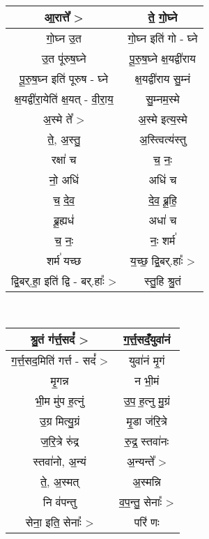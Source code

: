 {\centering
{\small {}} \\
\begin{longtable}{|c|c|}
\hline
आ॒रात्ते᳚ >                      & ते॒ गो॒घ्ने\\
\hline
गो॒घ्न उ॒त                      & गो॒घ्न इति॑ गो - घ्ने\\
\hline
उ॒त पू॑रुष॒घ्ने                     & पू॒रु॒ष॒घ्ने क्ष॒यद्वी॑राय\\
\hline
पू॒रु॒ष॒घ्न इति॑ पूरुष - घ्ने           & क्ष॒यद्वी॑राय सु॒म्नं\\
\hline
क्ष॒यद्वी॑रा॒येति॑ क्ष॒यत् - वी॒रा॒य॒     & सु॒म्नम॒स्मे\\
\hline
अ॒स्मे ते᳚ >                      & अ॒स्मे इत्य॒स्मे\\
\hline
ते॒, अ॒स्तु॒                        & अ॒स्त्वित्य॑स्तु\\
\hline
रक्षा॑ च                       & च॒ नः॒\\
\hline
नो॒ अधि॑                       & अधि॑ च\\
\hline
च॒ दे॒व॒                         & दे॒व॒ ब्रू॒हि॒\\
\hline
ब्रू॒ह्यध॑                        & अधा॑ च\\
\hline
च॒ नः॒                         & नः॒ शर्म॑\\
\hline
शर्म॑ यच्छ                      & य॒च्छ॒ द्वि॒बर्.हाः᳚ >\\
\hline
द्वि॒बर्.हा॒ इति॑ द्वि - बर्.हाः᳚ >  & स्तु॒हि श्रु॒तं\\
\hline
\end{longtable}
}
{\centering
{\small {}} \\
\begin{longtable}{|c|c|}
\hline
श्रु॒तं ग॑र्त्त॒सदं᳚ >                 & ग॒र्त्त॒सदंँ॒युवा॑नं\\
\hline
ग॒र्त्त॒सद॒मिति॑ गर्त्त - सदं᳚ >       & युवा॑नं मृ॒गं\\
\hline
मृ॒गन्न                         & न भी॒मं\\
\hline
भी॒म मु॑प ह॒त्नुं                     & उ॒प॒ ह॒त्नु मु॒ग्रं\\
\hline
उ॒ग्र मित्यु॒ग्रं                    & मृ॒डा ज॑रि॒त्रे\\
\hline
ज॒रि॒त्रे रु॑द्र                    & रु॒द्र॒ स्तवा॑नः\\
\hline
स्तवा॑नो, अ॒न्यं                   & अ॒न्यन्ते᳚ >\\
\hline
ते॒, अ॒स्मत्                       & अ॒स्मन्नि\\
\hline
नि व॑पन्तु                      & व॒प॒न्तु॒ सेनाः᳚ >\\
\hline
सेना॒ इति॒ सेनाः᳚ >               & परि॑ णः\\
\hline
\end{longtable}
}
